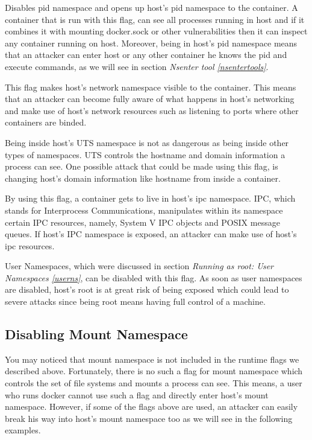 \begin{description}[style=nextline]
\item[--pid=host:]
Disables pid namespace and opens up host's pid namespace to the container. A container that is run with this flag, can see all processes running in host and if it combines it with mounting docker.sock or other vulnerabilities then it can inspect any container running on host. Moreover, being in host's pid namespace means that an attacker can enter host or any other container he knows the pid and execute commands, as we will see in section \textit{Nsenter tool \ref{nsentertools}}.

\item[--net=host:]
This flag makes host's network namespace visible to the container. This means that an attacker can become fully aware of what happens in host's networking and make use of host's network resources such as listening to ports where other containers are binded.

\item[--uts=host:]
Being inside host's UTS namespace is not as dangerous as being inside other types of namespaces. UTS controls the hostname and domain information a process can see. One possible attack that could be made using this flag, is changing host's domain information like hostname from inside a container.

\item[--ipc=host:]
By using this flag, a container gets to live in host's ipc namespace. IPC, which stands for Interprocess Communications, manipulates within its namespace certain IPC resources, namely, System V IPC objects and POSIX message queues. If host's IPC namespace is exposed, an attacker can make use of host's ipc resources.

\item[--userns=host:]
User Namespaces, which were discussed in section \textit{Running as root: User Namespaces \ref{userns}}, can be disabled with this flag. As soon as user namespaces are disabled, host's root is at great risk of being exposed which could lead to severe attacks since being root means having full control of a machine.
\end{description}

\subsection{Disabling Mount Namespace} \label{mounthostfs}

You may noticed that mount namespace is not included in the runtime flags we described above. Fortunately, there is no such a flag for mount namespace which controls the set of file systems and mounts a process can see. This means, a user who runs docker cannot use such a flag and directly enter host's mount namespace. However, if some of the flags above are used, an attacker can easily break his way into host's mount namespace too as we will see in the following examples.

